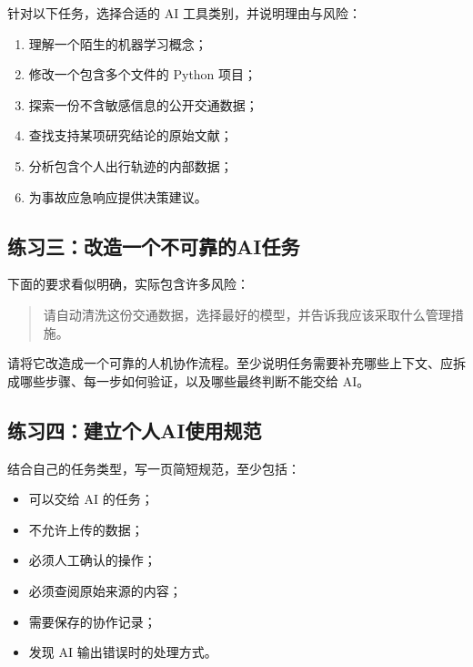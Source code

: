 针对以下任务，选择合适的 AI 工具类别，并说明理由与风险：

\begin{enumerate}
  \item 理解一个陌生的机器学习概念；
  \item 修改一个包含多个文件的 Python 项目；
  \item 探索一份不含敏感信息的公开交通数据；
  \item 查找支持某项研究结论的原始文献；
  \item 分析包含个人出行轨迹的内部数据；
  \item 为事故应急响应提供决策建议。
\end{enumerate}

\subsection*{练习三：改造一个不可靠的AI任务}

下面的要求看似明确，实际包含许多风险：

\begin{quote}
请自动清洗这份交通数据，选择最好的模型，并告诉我应该采取什么管理措施。
\end{quote}

请将它改造成一个可靠的人机协作流程。至少说明任务需要补充哪些上下文、应拆成哪些步骤、每一步如何验证，以及哪些最终判断不能交给 AI。

\subsection*{练习四：建立个人AI使用规范}

结合自己的任务类型，写一页简短规范，至少包括：

\begin{itemize}
  \item 可以交给 AI 的任务；
  \item 不允许上传的数据；
  \item 必须人工确认的操作；
  \item 必须查阅原始来源的内容；
  \item 需要保存的协作记录；
  \item 发现 AI 输出错误时的处理方式。
\end{itemize}





